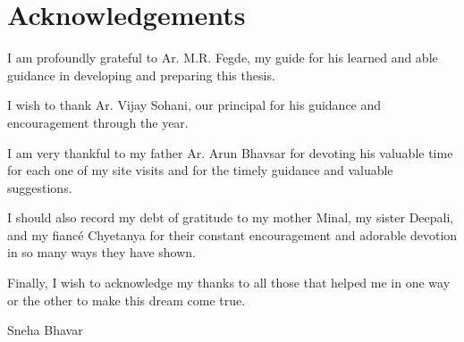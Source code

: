 \section*{Acknowledgements} %
\label{sec:ack}

I am profoundly grateful to Ar. M.R. Fegde, my guide for his learned and able guidance in developing and preparing this thesis.

I wish to thank Ar. Vijay Sohani, our principal for his guidance and encouragement through the year.

I am very thankful to my father Ar. Arun Bhavsar for devoting his valuable time for each one of my site visits and for the timely guidance and valuable suggestions.

I should also record my debt of gratitude to my mother Minal, my sister Deepali, and my fianc\'{e} Chyetanya for their constant encouragement and adorable devotion in so many ways they have shown.

Finally, I wish to acknowledge my thanks to all those that helped me in one way or the other to make this dream come true.

\vspace{3mm}

Sneha Bhavar

\vfill

